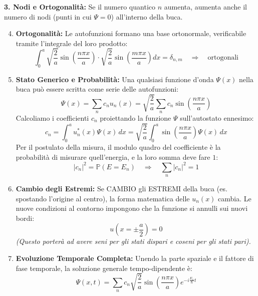 \documentclass[11pt, a4paper]{article}
\begin{document}
\noindent
\textbf{3. Nodi e Ortogonalità:} %
Se il numero quantico $n$ aumenta, aumenta anche il numero di nodi (punti in cui $\Psi=0$) all'interno della buca.

\begin{enumerate}
    \setcounter{enumi}{3}
    \item \textbf{Ortogonalità:} Le autofunzioni formano una base ortonormale, verificabile tramite l'integrale del loro prodotto:
    \begin{equation}
        \int_0^a \sqrt{\frac{2}{a}} \sin\left(\frac{n\pi x}{a}\right) \cdot \sqrt{\frac{2}{a}} \sin\left(\frac{m\pi x}{a}\right) dx = \delta_{n,m} \quad \Rightarrow \quad \text{ortogonali}
    \end{equation}

    \item \textbf{Stato Generico e Probabilità:} Una qualsiasi funzione d'onda $\Psi(x)$ nella buca può essere scritta come serie delle autofunzioni:
    \begin{equation*}
        \Psi(x) = \sum_n c_n u_n(x) = \sqrt{\frac{2}{a}} \sum_n c_n \sin\left(\frac{n\pi x}{a}\right)
    \end{equation*}
    Calcoliamo i coefficienti $c_n$ proiettando la funzione $\Psi$ sull'autostato ennesimo:
    \begin{equation*}
        c_n = \int_0^a u_n^*(x) \Psi(x) \, dx = \sqrt{\frac{2}{a}} \int_0^a \sin\left(\frac{n\pi x}{a}\right) \Psi(x) \, dx
    \end{equation*}
    Per il postulato della misura, il modulo quadro del coefficiente è la probabilità di misurare quell'energia, e la loro somma deve fare $1$:
    \begin{equation*}
        |c_n|^2 = \mathbb{P}(E = E_n) \quad \Rightarrow \quad \sum_n |c_n|^2 = 1
    \end{equation*}

    \item \textbf{Cambio degli Estremi:} Se CAMBIO gli ESTREMI della buca (es. spostando l'origine al centro), la forma matematica delle $u_n(x)$ cambia.
    Le nuove condizioni al contorno impongono che la funzione si annulli sui nuovi bordi:
    \begin{equation*}
        u\left(x = \pm \frac{a}{2}\right) = 0
    \end{equation*}
    \textit{(Questo porterà ad avere seni per gli stati dispari e coseni per gli stati pari).}

    \item \textbf{Evoluzione Temporale Completa:} Unendo la parte spaziale e il fattore di fase temporale, la soluzione generale tempo-dipendente è:
    \begin{equation}
        \Psi(x,t) = \sum_n c_n \sqrt{\frac{2}{a}} \sin\left(\frac{n\pi x}{a}\right) e^{-i\frac{E_n}{\hbar}t}
    \end{equation}


\end{enumerate}
\end{document}

